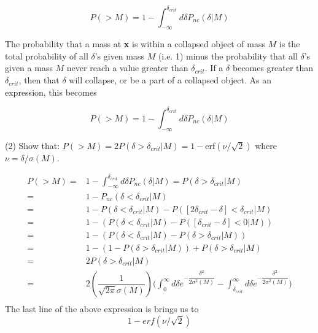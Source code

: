 \documentclass[a4paper]{article}
\begin{document}
\begin{equation}
P(>M) = 1 - \int_{-\infty}^{\delta_{crit}} d \delta P_{nc}(\delta|M)
\label{eq:3}
\end{equation}

The probability that a mass at \textbf{x} is within a collapsed object of mass $M$ is the total probability of all $\delta$'s given mass $M$ (i.e. 1) minus the probability that all $\delta$'s given a mass $M$ never reach a value greater than $\delta_{crit}$. If a $\delta$ becomes greater than $\delta_{crit}$, then that $\delta$ will collapse, or be a part of a collapsed object. As an expression, this becomes

\begin{equation}
P(>M) = 1 - \int_{-\infty}^{\delta_{crit}} d\delta P_{nc}(\delta|M)
\end{equation}

(2) Show that: $P(>M) = 2P(\delta > \delta_{crit}|M) = 1 - $erf$(\nu/\sqrt{2})$ where $\nu = \delta / \sigma(M)$.

\begin{align*}
P(>M) =& 1 - \int_{-\infty}^{\delta_{crit}} d\delta P_{nc}(\delta|M) =  P(\delta > \delta_{crit}|M) \\
=& 1 - P_{nc}(\delta < \delta_{crit}|M)\\
=& 1 - P(\delta<\delta_{crit}|M) - P([2\delta_{crit} - \delta]<\delta_{crit}|M) \\
=& 1 - (P(\delta<\delta_{crit}|M) - P([\delta_{crit} - \delta]<0|M)) \\
=& 1 - (P(\delta<\delta_{crit}|M) - P(\delta>\delta_{crit}|M)) \\
=& 1 - (1 - P(\delta>\delta_{crit}|M)) + P(\delta>\delta_{crit}|M) \\
=& 2P(\delta>\delta_{crit}|M) \\ 
=& 2(\dfrac{1}{\sqrt{2 \pi}\sigma(M)}) \Big(\int_{0}^{\infty} d\delta e^{ - \dfrac{\delta^2}{2\sigma^2(M)}} - \int_{\delta_{crit}}^{\infty} d \delta e^{ - \dfrac{\delta^2}{2\sigma^2(M)}} \Big) \\
\end{align*}
The last line of the above expression is brings us to
\begin{equation}
1 - erf(\nu/\sqrt{2})
\end{equation}
\end{document}
